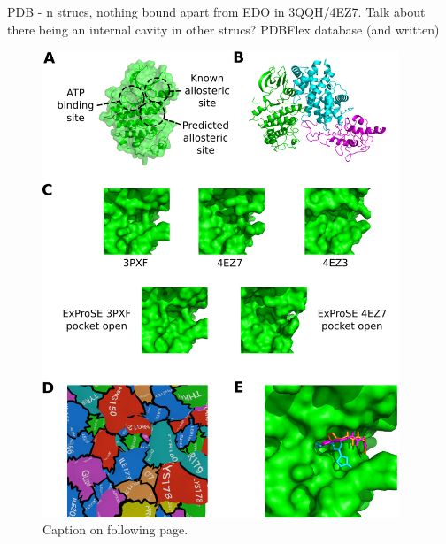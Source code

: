 PDB - n strucs, nothing bound apart from EDO in 3QQH/4EZ7.
Talk about there being an internal cavity in other strucs?
PDBFlex database (and written)


\begin{figure}
\centering

\includegraphics[width=0.95\textwidth]{figures/cdk2_structure/cdk2_structure}

\caption{Caption on following page.}

\label{fig:cdk2_structure}
\end{figure}

